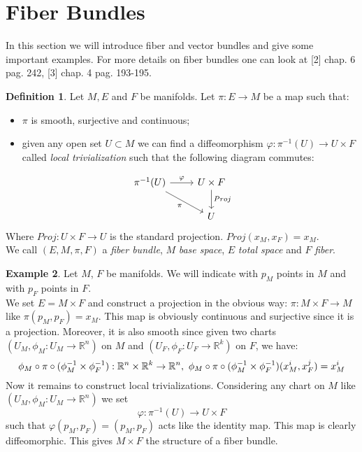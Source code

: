 \documentclass[12pt,a4paper]{report}
\theoremstyle{definition}
\newtheorem{Def}{Definition}[chapter]
\theoremstyle{Theorem}
\theoremstyle{definition}
\newtheorem{Ex}[Def]{Example}
\theoremstyle{definition}
\begin{document}
	\section{Fiber Bundles}
	In this section we will introduce fiber and vector bundles and give some important examples. For more details on fiber bundles one can look at [2] chap. 6 pag. 242, [3] chap. 4 pag. 193-195.
	\begin{Def}
		Let $M, E$ and $F$ be manifolds. Let $\pi: E\rightarrow M$ be a map such that:
		\begin{itemize}
			\item $\pi$ is smooth, surjective and continuous;
			\item given any open set $U\subset M$ we can find a diffeomorphism $\varphi: \pi^{-1}(U)\rightarrow U\times F$ called \textit{local trivialization} such that the following diagram commutes:
		\end{itemize}
		\[
		\begin{tikzcd}
			\pi^{-1}(U) \arrow{r}{\varphi} \arrow[swap]{dr}{\pi} & U\times F \arrow{d}{Proj}\\
			& U 
		\end{tikzcd}
		\]
		Where $Proj: U\times F\rightarrow U$ is the standard projection. $Proj(x_M,x_F)=x_M$.\\
		We call $(E,M,\pi,F)$ a \textit{fiber bundle}, $M$ \textit{base space}, $E$ \textit{total space} and $F$ \textit{fiber}.
	\end{Def}
	\begin{Ex}\label{Ex_1.1}
		Let $M$, $F$ be manifolds. We will indicate with $p_M$ points in $M$ and with $p_F$ points in $F$.\\ 
		We set $E=M\times F$ and construct a projection in the obvious way: 
		$\pi:M\times F\rightarrow M$ like $\pi(p_M,p_F)=x_M$. This map is obviously continuous and surjective since it is a projection. Moreover, it is also smooth since given two charts $(U_M,\phi_M:U_M\rightarrow \mathbb{R}^n)$ on $M$ and $(U_F,\phi_F:U_F\rightarrow \mathbb{R}^k)$ on $F$, we have:
		$$\phi_M\circ \pi\circ (\phi_M^{-1}\times \phi_F^{-1}):\mathbb{R}^n\times\mathbb{R}^k\rightarrow\mathbb{R}^n,\hbox{ }\phi_M\circ \pi\circ (\phi_M^{-1}\times \phi_F^{-1})(x^i_M,x^j_F)=x^i_M$$
		Now it remains to construct local trivializations. Considering any chart on $M$ like $(U_M,\phi_M:U_M\rightarrow \mathbb{R}^n)$ we set
		$$\varphi:\pi^{-1}(U)\rightarrow U\times F$$
		such that $\varphi(p_M,p_F)=(p_M,p_F)$ acts like the identity map. This map is clearly diffeomorphic.
		This gives $M\times F$ the structure of a fiber bundle.
	\end{Ex}
\end{document}
